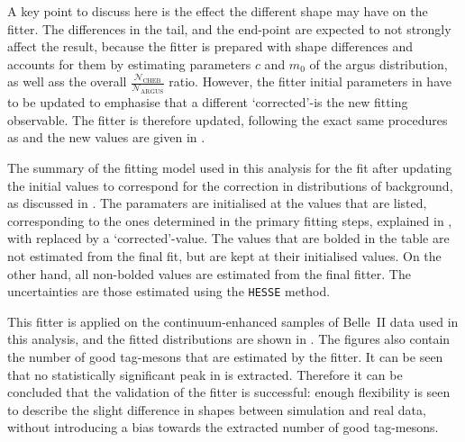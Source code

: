 A key point to discuss here is the effect the different \Mbc shape may have on the \Mbc fitter.
The differences in the tail, and the end-point are expected to not strongly affect the result, because the \Mbc fitter is prepared with shape differences and accounts for them
by estimating parameters $c$ and $m_0$ of the argus distribution, as well ass the overall $\frac{\mathcal{N}_{\mathrm{CHEB}}}{\mathcal{N}_{\mathrm{ARGUS}}}$ ratio.
However, the \Mbc fitter initial parameters in  have to be updated to emphasise that a different `corrected'-\Mbc is the new fitting observable.
The \Mbc fitter is therefore updated, following the exact same procedures as  and the new values are given in .
\begin{table}[htbp!]
    \centering
    \caption{\label{tab:fitting_init_params_updated} The summary of the fitting model used in this analysis for the \Mbc fit after updating the initial values to correspond for the correction in \Mbc distributions of background, as discussed in .
    The paramaters are initialised at the values that are listed, corresponding to the ones determined in the primary fitting steps, explained in , with \Mbc replaced by a `corrected'-\Mbc value.
    The values that are bolded in the table are not estimated from the final \Mbc fit, but are kept at their initialised values.
    On the other hand, all non-bolded values are estimated from the final fitter.
    The uncertainties are those estimated using the \texttt{HESSE} method.
    }
    
\end{table}

This fitter is applied on the continuum-enhanced samples of Belle~II data used in this analysis,
and the  fitted \Mbc distributions are shown in .
The figures also contain the number of good tag-\B mesons that are estimated by the fitter.
It can be seen that no statistically significant peak in \Mbc is extracted.
Therefore it can be concluded that the validation of the \Mbc fitter is successful: enough flexibility is seen
to describe the slight difference in \Mbc shapes between simulation and real data, without introducing a bias towards the extracted number of good tag-\B mesons.


